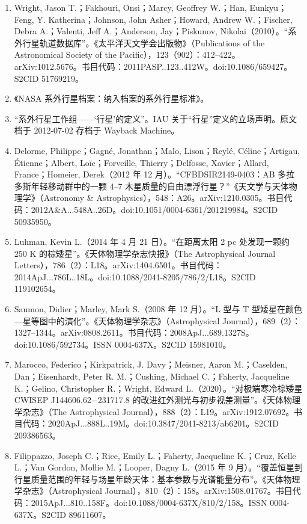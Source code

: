 \begin{enumerate}
\item Wright, Jason T.；Fakhouri, Onsi；Marcy, Geoffrey W.；Han, Eunkyu；Feng, Y. Katherina；Johnson, John Asher；Howard, Andrew W.；Fischer, Debra A.；Valenti, Jeff A.；Anderson, Jay；Piskunov, Nikolai（2010）。“系外行星轨道数据库”。《太平洋天文学会出版物》（Publications of the Astronomical Society of the Pacific），123（902）：412–422。arXiv:1012.5676。书目代码：2011PASP..123..412W。doi:10.1086/659427。S2CID 51769219。
\item 《NASA 系外行星档案：纳入档案的系外行星标准》。
\item “系外行星工作组——‘行星’的定义”。IAU 关于“行星”定义的立场声明。原文档于 2012-07-02 存档于 Wayback Machine。
\item Delorme, Philippe；Gagné, Jonathan；Malo, Lison；Reylé, Céline；Artigau, Étienne；Albert, Loïc；Forveille, Thierry；Delfosse, Xavier；Allard, France；Homeier, Derek（2012 年 12 月）。“CFBDSIR2149-0403：AB 多拉多斯年轻移动群中的一颗 4–7 木星质量的自由漂浮行星？”《天文学与天体物理学》（Astronomy & Astrophysics），548：A26。arXiv:1210.0305。书目代码：2012A&A...548A..26D。doi:10.1051/0004-6361/201219984。S2CID 50935950。
\item Luhman, Kevin L.（2014 年 4 月 21 日）。“在距离太阳 2 pc 处发现一颗约 250 K 的棕矮星”。《天体物理学杂志快报》（The Astrophysical Journal Letters），786（2）：L18。arXiv:1404.6501。书目代码：2014ApJ...786L..18L。doi:10.1088/2041-8205/786/2/L18。S2CID 119102654。
\item Saumon, Didier；Marley, Mark S.（2008 年 12 月）。“L 型与 T 型矮星在颜色—星等图中的演化”。《天体物理学杂志》（Astrophysical Journal），689（2）：1327–1344。arXiv:0808.2611。书目代码：2008ApJ...689.1327S。doi:10.1086/592734。ISSN 0004-637X。S2CID 15981010。
\item Marocco, Federico；Kirkpatrick, J. Davy；Meisner, Aaron M.；Caselden, Dan；Eisenhardt, Peter R. M.；Cushing, Michael C.；Faherty, Jacqueline K.；Gelino, Christopher R.；Wright, Edward L.（2020）。“对极端寒冷棕矮星 CWISEP J144606.62−231717.8 的改进红外测光与初步视差测量”。《天体物理学杂志》（The Astrophysical Journal），888（2）：L19。arXiv:1912.07692。书目代码：2020ApJ...888L..19M。doi:10.3847/2041-8213/ab6201。S2CID 209386563。
\item Filippazzo, Joseph C.；Rice, Emily L.；Faherty, Jacqueline K.；Cruz, Kelle L.；Van Gordon, Mollie M.；Looper, Dagny L.（2015 年 9 月）。“覆盖恒星到行星质量范围的年轻与场星年龄天体：基本参数与光谱能量分布”。《天体物理学杂志》（Astrophysical Journal），810（2）：158。arXiv:1508.01767。书目代码：2015ApJ...810..158F。doi:10.1088/0004-637X/810/2/158。ISSN 0004-637X。S2CID 89611607。

\end{enumerate}
